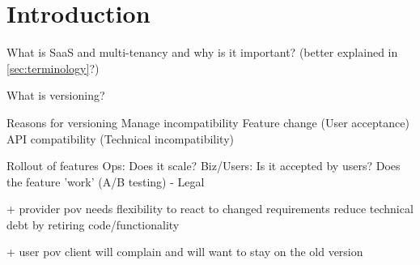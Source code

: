 \section{Introduction}

What is SaaS and multi-tenancy and why is it important? (better explained in \ref{sec:terminology}?)

What is versioning?

Reasons for versioning
  Manage incompatibility
    Feature change (User acceptance)
    API compatibility (Technical incompatibility)

  Rollout of features
    Ops: Does it scale?
    Biz/Users: Is it accepted by users? Does the feature 'work' (A/B testing)
  - Legal

  + provider pov
  needs flexibility to react to changed requirements
  reduce technical debt by retiring code/functionality

  + user pov
  client will complain and will want to stay on the old version
